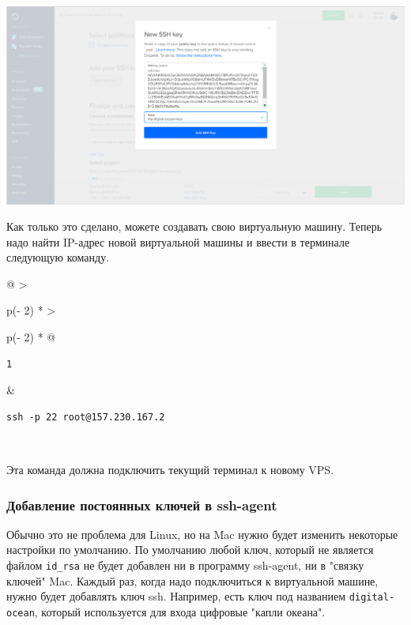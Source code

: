 \documentclass{article}
\begin{document}
\includegraphics{blog/2019/bash-essentials/digital-ocean-key.png}

Как только это сделано, можете создавать свою виртуальную машину. Теперь
надо найти IP-адрес новой виртуальной машины и ввести в терминале
следующую команду.

\begin{longtable}[]{@{}
  >{\raggedright\arraybackslash}p{(\columnwidth - 2\tabcolsep) * }
  >{\raggedright\arraybackslash}p{(\columnwidth - 2\tabcolsep) * }@{}}
\toprule
\endhead
\begin{minipage}[t]{\linewidth}\raggedright
\begin{verbatim}
1
\end{verbatim}
\end{minipage} & \begin{minipage}[t]{\linewidth}\raggedright
\begin{verbatim}
ssh -p 22 root@157.230.167.2
\end{verbatim}
\end{minipage} \\ \addlinespace
\bottomrule
\end{longtable}

Эта команда должна подключить текущий терминал к новому VPS.

\hypertarget{Permanently-Add-Keys-to-ssh-agent}{%
\subsubsection{\texorpdfstring{\protect\hyperlink{Permanently-Add-Keys-to-ssh-agent}{}Добавление
постоянных ключей в
ssh-agent}{Добавление постоянных ключей в ssh-agent}}\label{Permanently-Add-Keys-to-ssh-agent}}

Обычно это не проблема для Linux, но на Mac нужно будет изменить
некоторые настройки по умолчанию. По умолчанию любой ключ, который не
является файлом \texttt{id\_rsa} не будет добавлен ни в программу
ssh-agent, ни в "связку ключей" Mac. Каждый раз, когда надо подключиться
к виртуальной машине, нужно будет добавлять ключ ssh. Например, есть
ключ под названием \texttt{digital-ocean}, который используется для
входа цифровые "капли океана".
\end{document}
